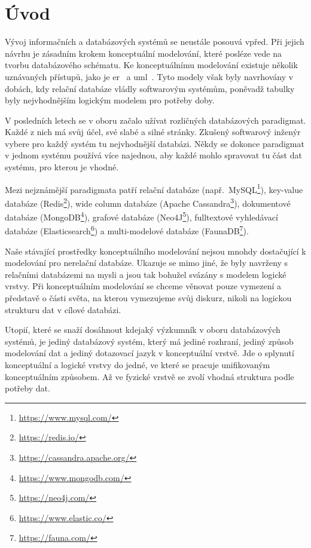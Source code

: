 \chapter*{Úvod}

Vývoj informačních a databázových systémů se neustále posouvá vpřed.
Při jejich návrhu je zásadním krokem konceptuální modelování, které posléze vede na tvorbu databázového schématu.
Ke konceptuálnímu modelování existuje několik uznávaných přístupů, jako je \acrfull{er}~\cite{chen_er_1976} a \acrfull{uml}~\cite{omg_uml_2017}.
Tyto modely však byly navrhovány v dobách, kdy relační databáze vládly softwarovým systémům, poněvadž tabulky byly nejvhodnějším logickým modelem pro potřeby doby.

V posledních letech se v oboru začalo užívat rozličných databázových paradigmat.
Každé z nich má svůj účel, své slabé a silné stránky.
Zkušený softwarový inženýr vybere pro každý systém tu nejvhodnější databázi.
Někdy se dokonce paradigmat v jednom systému používá více najednou, aby každé mohlo spravovat tu část dat systému, pro kterou je vhodné.

Mezi nejznámější paradigmata patří
relační databáze (např.~MySQL\footnote{\url{https://www.mysql.com/}}),
key-value databáze (Redis\footnote{\url{https://redis.io/}}),
wide column databáze (Apache Cassandra\footnote{\url{https://cassandra.apache.org/}}),
dokumentové databáze (MongoDB\footnote{\url{https://www.mongodb.com/}}),
grafové databáze (Neo4J\footnote{\url{https://neo4j.com/}}),
fulltextové vyhledávací databáze (Elasticsearch\footnote{\url{https://www.elastic.co/}})
a multi-modelové databáze (FaunaDB\footnote{\url{https://fauna.com/}}).

Naše stávající prostředky konceptuálního modelování nejsou mnohdy dostačující k modelování pro nerelační databáze.
Ukazuje se mimo jiné, že byly navrženy s relačními databázemi na mysli a jsou tak bohužel svázány s modelem logické vrstvy.
Při konceptuálním modelování se chceme věnovat pouze vymezení a představě o části světa, na kterou vymezujeme svůj diskurz, nikoli na logickou strukturu dat v cílové databázi.

Utopií, které se snaží dosáhnout kdejaký výzkumník v oboru databázových systémů, je jediný databázový systém, který má jediné rozhraní, jediný způsob modelování dat a jediný dotazovací jazyk v konceptuální vrstvě.
Jde o splynutí konceptuální a logické vrstvy do jedné, ve které se pracuje unifikovaným konceptuálním způsobem.
Až ve fyzické vrstvě se zvolí vhodná struktura podle potřeby dat.

